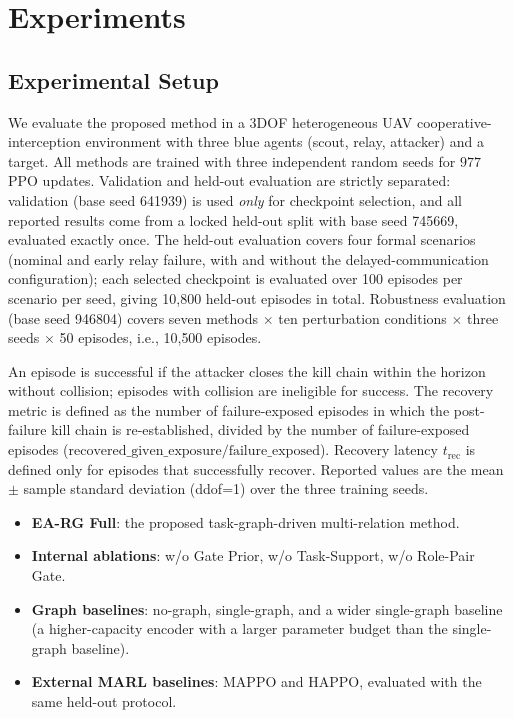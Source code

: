 \section{Experiments}
\label{sec:experiments}

\subsection{Experimental Setup}
\label{sec:setup}

We evaluate the proposed method in a 3DOF heterogeneous UAV cooperative-interception environment with three blue agents (scout, relay, attacker) and a target. All methods are trained with three independent random seeds for $977$ PPO updates. Validation and held-out evaluation are strictly separated: validation (base seed 641939) is used \emph{only} for checkpoint selection, and all reported results come from a locked held-out split with base seed 745669, evaluated exactly once. The held-out evaluation covers four formal scenarios (nominal and early relay failure, with and without the delayed-communication configuration); each selected checkpoint is evaluated over 100 episodes per scenario per seed, giving 10{,}800 held-out episodes in total. Robustness evaluation (base seed 946804) covers seven methods $\times$ ten perturbation conditions $\times$ three seeds $\times$ 50 episodes, i.e., 10{,}500 episodes.

An episode is successful if the attacker closes the kill chain within the horizon without collision; episodes with collision are ineligible for success. The recovery metric is defined as the number of failure-exposed episodes in which the post-failure kill chain is re-established, divided by the number of failure-exposed episodes ($\mathrm{recovered\_given\_exposure} / \mathrm{failure\_exposed}$). Recovery latency $t_{\mathrm{rec}}$ is defined only for episodes that successfully recover. Reported values are the mean $\pm$ sample standard deviation (ddof=1) over the three training seeds.

\begin{itemize}
    \item \textbf{EA-RG Full}: the proposed task-graph-driven multi-relation method.
    \item \textbf{Internal ablations}: w/o Gate Prior, w/o Task-Support, w/o Role-Pair Gate.
    \item \textbf{Graph baselines}: no-graph, single-graph, and a wider single-graph baseline (a higher-capacity encoder with a larger parameter budget than the single-graph baseline).
    \item \textbf{External MARL baselines}: MAPPO and HAPPO, evaluated with the same held-out protocol.
\end{itemize}

